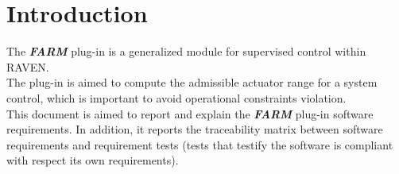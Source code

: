 \section{Introduction}
The \textbf{\textit{FARM}} plug-in is a generalized module for supervised control within RAVEN.
\\The plug-in is aimed to compute the admissible actuator range for a system control, which is 
important to avoid operational constraints violation.
\\This document is aimed to report and explain the  \textbf{\textit{FARM}} plug-in software requirements. 
In addition, it reports the traceability matrix between software requirements and requirement tests 
(tests that testify the software is compliant with respect its own requirements).
